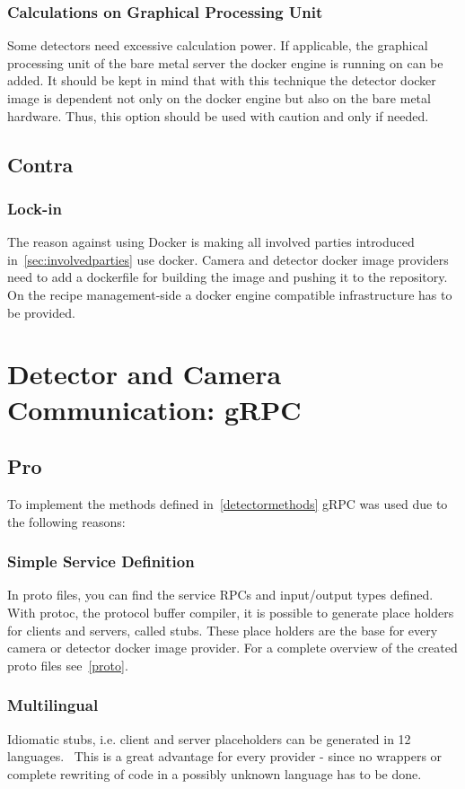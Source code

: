  \subsubsection{Calculations on Graphical Processing Unit}
 Some detectors need excessive calculation power. If applicable, the graphical processing unit of the bare metal server the docker engine is running on can be added. It should be kept in mind that with this technique the detector docker image is dependent not only on the docker engine but also on the bare metal hardware. Thus, this option should be used with caution and only if needed.
\subsection{Contra}
\subsubsection{Lock-in}
The reason against using Docker is making all involved parties introduced in~\ref{sec:involvedparties} use docker. Camera and detector docker image providers need to add a dockerfile for building the image and pushing it to the repository. On the recipe management-side a docker engine compatible infrastructure has to be provided. 

\section{Detector and Camera Communication: gRPC}
\subsection{Pro}
To implement the methods defined in~\ref{detectormethods} gRPC was used due to the following reasons: 
\subsubsection{Simple Service Definition}
In proto files, you can find the service RPCs and input/output types defined. With protoc, the protocol buffer compiler, it is possible to generate place holders for clients and servers, called stubs. These place holders are the base for every camera or detector docker image provider. For a complete overview of the created proto files see~\ref{proto}. 
\subsubsection{Multilingual}
Idiomatic stubs, i.e. client and server placeholders can be generated in 12 languages.~\cite{gRPC-Documentation2019Last2019} This is a great advantage for every provider - since no wrappers or complete rewriting of code in a possibly unknown language has to be done.
